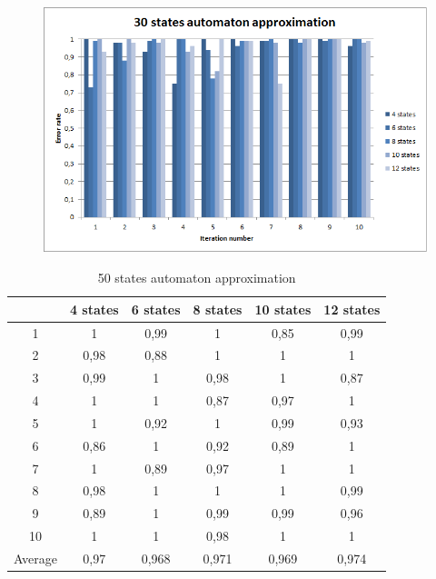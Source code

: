 \documentclass[runningheads,a4paper]{llncs}
\begin{document}
\begin{figure}
\centering
\includegraphics[scale=1]{8.png}
\end{figure}

\begin{table}[]
\centering
\caption{50 states automaton approximation}
\label{my-label}
\begin{tabular}{@{}cccccc@{}}
\toprule
        & 4 states & 6 states & 8 states & 10 states & 12 states    \\ \midrule
1       & 1        & 0,99     & 1        & 0,85      & 0,99 \\
2       & 0,98     & 0,88     & 1        & 1         & 1 \\
3       & 0,99     & 1        & 0,98     & 1         & 0,87 \\
4       & 1        & 1        & 0,87     & 0,97      & 1   \\
5       & 1        & 0,92     & 1        & 0,99      & 0,93   \\
6       & 0,86     & 1        & 0,92     & 0,89      & 1    \\
7       & 1        & 0,89     & 0,97     & 1         & 1    \\
8       & 0,98     & 1        & 1        & 1         & 0,99    \\
9       & 0,89     & 1        & 0,99     & 0,99      & 0,96 \\
10      & 1        & 1        & 0,98     & 1         & 1  \\
Average & 0,97    & 0,968     & 0,971    & 0,969     & 0,974  \\ \bottomrule
\end{tabular}
\end{table}
\end{document}
